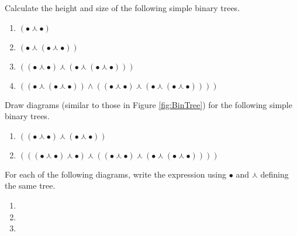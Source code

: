 \begin{exer}
	\begin{exercise}
  \item Calculate the height and size of the following simple binary trees.
    \begin{enumerate}
    \item $(\bullet\curlywedge\bullet)$
    \item $(\bullet\curlywedge (\bullet\curlywedge\bullet))$
    \item $((\bullet\curlywedge\bullet)\curlywedge(\bullet\curlywedge(\bullet\curlywedge\bullet)))$
    \item $((\bullet\curlywedge(\bullet\curlywedge\bullet))\wedge ((\bullet\curlywedge\bullet)\curlywedge(\bullet\curlywedge(\bullet\curlywedge\bullet))))$
    \end{enumerate}
   \item Draw diagrams (similar to those in Figure \ref{fig:BinTree}) for the following
   simple binary trees.
   \begin{enumerate}
   \item $((\bullet \curlywedge \bullet)\curlywedge(\bullet\curlywedge\bullet))$
   \item $(((\bullet\curlywedge\bullet)\curlywedge\bullet)\curlywedge ((\bullet\curlywedge\bullet)\curlywedge(\bullet\curlywedge(\bullet\curlywedge\bullet))))$
   \end{enumerate}
   \item For each of the following diagrams, write the expression using $\bullet$ and $\curlywedge$
    defining the same tree.
\begin{multicols}{2}
    \begin{enumerate}
    \item 
{}

 \item 


\item


    \end{enumerate}
  \end{multicols}
  \end{exercise}
\end{exer}

